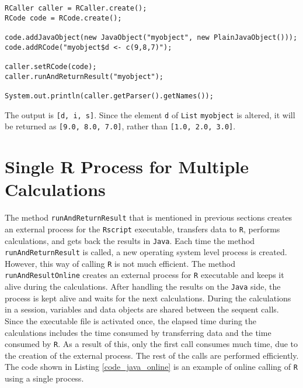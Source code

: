 \documentclass[10pt,a4paper, final, oneside]{article}
\begin{document}
\begin{minipage}{\linewidth}
\begin{lstlisting}[caption=Passing Java Objects,label=code_java_pass_object]
RCaller caller = RCaller.create();
RCode code = RCode.create();

code.addJavaObject(new JavaObject("myobject", new PlainJavaObject()));
code.addRCode("myobject$d <- c(9,8,7)");

caller.setRCode(code);
caller.runAndReturnResult("myobject");

System.out.println(caller.getParser().getNames());
\end{lstlisting}
\end{minipage}

The output is \texttt{[d, i, s]}. Since the element \texttt{d} of \texttt{List} \texttt{myobject} is altered, it will be returned as \texttt{[9.0, 8.0, 7.0]}, rather than \texttt{[1.0, 2.0, 3.0]}.


\section{Single R Process for Multiple Calculations}
\label{sec:single_R_Process_for_multiple_calculations}
The method \texttt{runAndReturnResult} that is mentioned in previous sections creates an external process for the \texttt{Rscript} executable, transfers data to \texttt{R}, performs calculations, and gets back the results in \texttt{Java}. Each time the method \texttt{runAndReturnResult} is called, a new operating system level process is created. However, this way of calling \texttt{R} is not much efficient. The method \texttt{runAndResultOnline} creates an external process for \texttt{R} executable and keeps it alive during the calculations. After handling the results on the \texttt{Java} side, the process is kept alive and waits for the next calculations. During the calculations in a session, variables and data objects are shared between the sequent calls. Since the executable file is activated once, the elapsed time during the calculations includes the time consumed by transferring data and the time consumed by \texttt{R}. As a result of this, only the first call consumes much time, due to the creation of the external process. The rest of the calls are performed efficiently. The code shown in Listing \ref{code_java_online} is an example of online calling of \texttt{R} using a single process.
\end{document}
